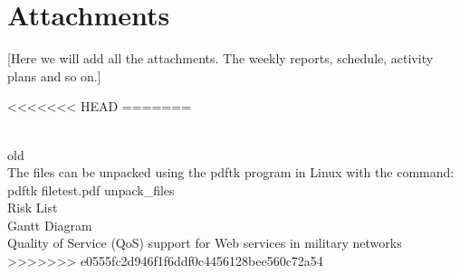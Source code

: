 \section{Attachments}\label{Attachments} 

    [Here we will add all the attachments. The weekly reports, schedule, activity plans and so on.]

<<<<<<< HEAD
=======

    \\ old\\
The files can be unpacked using the pdftk program in Linux with the command: 
    pdftk filetest.pdf unpack\_files \\
     Risk List \\
     Gantt Diagram \\
     Quality of Service (QoS) support for Web services in military networks \\
    
>>>>>>> e0555fc2d946f1f6ddf0c4456128bee560c72a54
